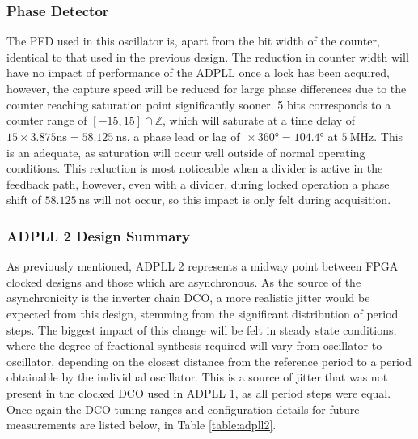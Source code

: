 \subsubsection{Phase Detector}
The \ac{PFD} used in this oscillator is, apart from the bit width of the counter, identical to that used in the previous design. The reduction in counter width will have no impact of performance of the \ac{ADPLL} once a lock has been acquired, however, the capture speed will be reduced for large phase differences due to the counter reaching saturation point significantly sooner. 5 bits corresponds to a counter range of $[-15,15]\cap\mathbb{Z}$, which will saturate at a time delay of $15\times3.875\si{\nano\second} = 58.125~\si{\nano\second}$, a phase lead or lag of $\frac{}{}\times360\si{\degree} = 104.4\si{\degree}$ at $5~\si{\mega\hertz}$. This is an adequate, as saturation will occur well outside of normal operating conditions. This reduction is most noticeable when a divider is active in the feedback path, however, even with a divider, during locked operation a phase shift of $58.125~\si{\nano\second}$ will not occur, so this impact is only felt during acquisition.

\subsubsection{\acs{ADPLL} 2 Design Summary}
As previously mentioned, \ac{ADPLL} 2 represents a midway point between \ac{FPGA} clocked designs and those which are asynchronous. As the source of the asynchronicity is the inverter chain \ac{DCO}, a more realistic jitter would be expected from this design, stemming from the significant distribution of period steps. The biggest impact of this change will be felt in steady state conditions, where the degree of fractional synthesis required will vary from oscillator to oscillator, depending on the closest distance from the reference period to a period obtainable by the individual oscillator. This is a source of jitter that was not present in the clocked \ac{DCO} used in \ac{ADPLL} 1, as all period steps were equal. Once again the \ac{DCO} tuning ranges and configuration details for future measurements are listed below, in Table \ref{table:adpll2}.

